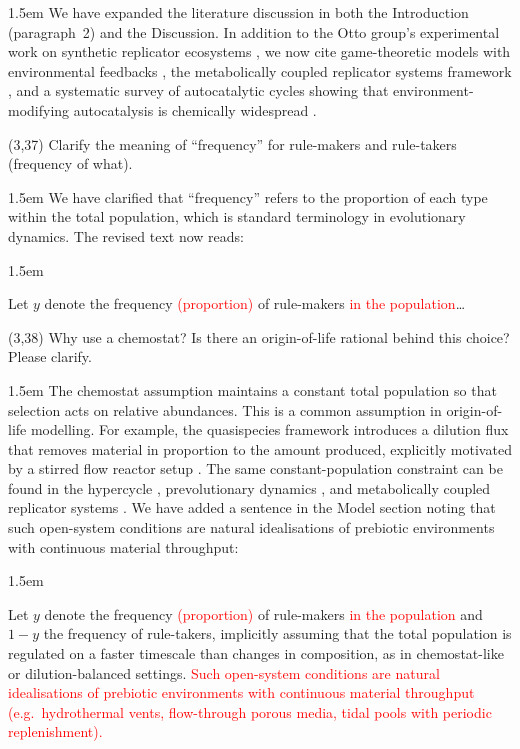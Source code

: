 \documentclass[11pt]{article}
\newcommand{\rev}[1]{\textcolor{red}{#1}}
\newcommand{\RC}[1]{\medskip\noindent #1\par}
\newenvironment{response}{\medskip\begin{adjustwidth}{1.5em}{}\color{blue}\mdseries\sloppy}{\end{adjustwidth}\color{black}}
\newenvironment{manuscript}{%
  \begin{adjustwidth}{1.5em}{}%
  \begin{mdframed}[
    topline=false, bottomline=false, rightline=false,
    linewidth=2pt, linecolor=red,
    innerleftmargin=1em, innerrightmargin=0pt,
    innertopmargin=0.4em, innerbottommargin=0.4em,
    skipabove=\medskipamount, skipbelow=\medskipamount
  ]\color{black}%
}{%
  \end{mdframed}%
  \end{adjustwidth}%
}
\begin{document}
\begin{response}
We have expanded the literature discussion in both the Introduction (paragraph~2) and the Discussion. In addition to the Otto group's experimental work on synthetic replicator ecosystems \citep{Liu2024Otto}, we now cite game-theoretic models with environmental feedbacks \citep{Tilman2020}, the metabolically coupled replicator systems framework \citep{Czaran2015MCRS,Adamski2020}, and a systematic survey of autocatalytic cycles showing that environment-modifying autocatalysis is chemically widespread \citep{Peng2023Autocatalysis}.
\end{response}

\RC{(3,37) Clarify the meaning of ``frequency'' for rule-makers and rule-takers (frequency of what).}

\begin{response}
We have clarified that ``frequency'' refers to the proportion of each type within the total population, which is standard terminology in evolutionary dynamics. The revised text now reads:
\end{response}

\begin{manuscript}Let $y$ denote the frequency \rev{(proportion)} of rule-makers \rev{in the population}\ldots
\end{manuscript}

\RC{(3,38) Why use a chemostat? Is there an origin-of-life rational behind this choice? Please clarify.}

\begin{response}
The chemostat assumption maintains a constant total population so that selection acts on relative abundances. This is a common assumption in origin-of-life modelling. For example, the quasispecies framework introduces a dilution flux that removes material in proportion to the amount produced, explicitly motivated by a stirred flow reactor setup \citep{EigenMcCaskillSchuster1989}. The same constant-population constraint can be found in the hypercycle \citep{Eigen1977}, prevolutionary dynamics \citep{Nowak2008Prelife}, and metabolically coupled replicator systems \citep{Czaran2015MCRS}. We have added a sentence in the Model section noting that such open-system conditions are natural idealisations of prebiotic environments with continuous material throughput:
\end{response}

\begin{manuscript}Let $y$ denote the frequency \rev{(proportion)} of rule-makers \rev{in the population} and $1-y$ the frequency of rule-takers, implicitly assuming that the total population is regulated on a faster timescale than changes in composition, as in chemostat-like or dilution-balanced settings. \rev{Such open-system conditions are natural idealisations of prebiotic environments with continuous material throughput (e.g.\ hydrothermal vents, flow-through porous media, tidal pools with periodic replenishment).}
\end{manuscript}
\end{document}
